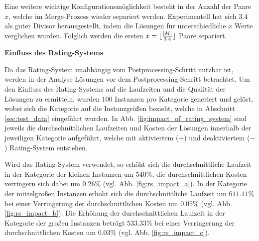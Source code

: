 Eine weitere wichtige Konfigurationsmöglichkeit besteht in der Anzahl der Paare $x$, welche im Merge-Prozess wieder
separiert werden. Experimentell hat sich $3.4$ als guter Divisor herausgestellt, indem die Lösungen für unterschiedliche $x$ Werte verglichen wurden. Folglich werden die ersten $x = \lfloor\frac{|M|}{3.4}\rfloor$ Paare separiert.

\textbf{Einfluss des Rating-Systems}

Da das Rating-System unabhängig vom Postprocessing-Schritt nutzbar ist, werden in der Analyse Lösungen vor dem Postprocessing-Schritt betrachtet. Um den Einfluss des Rating-Systems auf die Laufzeiten und die Qualität der
Lösungen zu ermitteln, wurden $100$ Instanzen pro Kategorie generiert und gelöst, wobei sich die Kategorie
auf die Instanzgrößen bezieht, welche in Abschnitt \ref{sec:test_data} eingeführt wurden.
In Abb. \ref{fig:impact_of_rating_system} sind jeweils die durchschnittlichen Laufzeiten und Kosten der Lösungen
innerhalb der jeweiligen Kategorie aufgeführt, welche mit aktiviertem ($+$) und deaktiviertem ($-$)
Rating-System entstehen.

Wird das Rating-System verwendet, so erhöht sich die durchschnittliche Laufzeit in der Kategorie der kleinen Instanzen
um $540 \%$, die durchschnittlichen Kosten verringern sich dabei um $0.26 \%$ (vgl. Abb. \ref{fig:rs_impact_a}).
In der Kategorie der mittelgroßen Instanzen erhöht sich die durchschnittliche Laufzeit um $611.11 \%$ bei einer
Verringerung der durchschnittlichen Kosten um $0.05 \%$ (vgl. Abb. \ref{fig:rs_impact_b}).
Die Erhöhung der durchschnittlichen Laufzeit in der Kategorie der großen Instanzen beträgt $533.33 \%$
bei einer Verringerung der durchschnittlichen Kosten um $0.03 \%$ (vgl. Abb. \ref{fig:rs_impact_c}).

